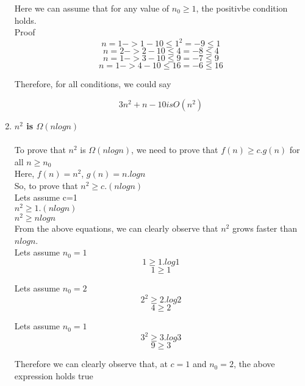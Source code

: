 \documentclass[11pt]{article}
\theoremstyle{definition}
\newcommand{\solution}{\medskip\noindent{\color{DarkBlue}\textbf{Solution:}}}
\begin{document}
\begin{enumerate}
    Here we can assume that for any value of $n_0 \geq 1$, the positivbe condition holds. \\

    Proof 
    \[n=1 -> 1-10 \leq 1^2 = -9 \leq 1 \]
    \[n=2 -> 2-10 \leq 4 = -8 \leq 4 \]
    \[n=1 -> 3-10 \leq 9 = -7 \leq 9 \]
    \[n=1 -> 4-10 \leq 16 = -6 \leq 16 \]

    Therefore, for all conditions, we could say

    \[ 3n^2+n-10 is O(n^2) \]

    \item \textbf{$n^2$ is $\Omega(nlogn)$} \\
    \solution \\
    To prove that $n^2$ is $\Omega(nlogn)$, we need to prove that $f(n) \geq c.g(n)$ for all $n \geq n_0$ \\

    Here, $f(n) = n^2$, $g(n) = n.logn$ \\

    So, to prove that $n^2 \geq c.(nlogn)$ \\
    Lets assume c=1 \\

    $n^2 \geq 1.(nlogn)$ \\
    $n^2 \geq nlogn$ \\

    From the above equations, we can clearly observe that $n^2$ grows faster than $nlogn$.\\

    Lets assume $n_0=1$
    \[ 1 \geq 1.log1 \]
    \[ 1 \geq 1 \]

    Lets assume $n_0=2$
    \[ 2^2 \geq 2.log2 \]
    \[ 4 \geq 2 \]

    Lets assume $n_0=1$
    \[ 3^2 \geq 3.log3 \]
    \[ 9 \geq 3 \]

    Therefore we can clearly observe that, at $c=1$ and $n_0=2$, the above expression holds true

\end{enumerate}
\end{document}
